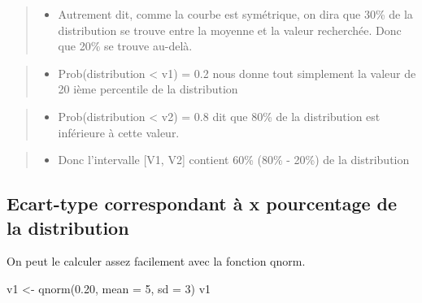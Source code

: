 \documentclass[
]{article}
\newenvironment{Shaded}{\begin{snugshade}}{\end{snugshade}}
\newcommand{\AttributeTok}[1]{\textcolor[rgb]{0.77,0.63,0.00}{#1}}
\newcommand{\DecValTok}[1]{\textcolor[rgb]{0.00,0.00,0.81}{#1}}
\newcommand{\FloatTok}[1]{\textcolor[rgb]{0.00,0.00,0.81}{#1}}
\newcommand{\FunctionTok}[1]{\textcolor[rgb]{0.00,0.00,0.00}{#1}}
\newcommand{\NormalTok}[1]{#1}
\newcommand{\OtherTok}[1]{\textcolor[rgb]{0.56,0.35,0.01}{#1}}
\providecommand{\tightlist}{%
  \setlength{\itemsep}{0pt}\setlength{\parskip}{0pt}}
\begin{document}
\begin{quote}
\begin{itemize}
\tightlist
\item
  Autrement dit, comme la courbe est symétrique, on dira que 30\% de la
  distribution se trouve entre la moyenne et la valeur recherchée. Donc
  que 20\% se trouve au-delà.
\end{itemize}
\end{quote}

\begin{quote}
\begin{itemize}
\tightlist
\item
  Prob(distribution \textless{} v1) = 0.2 nous donne tout simplement la
  valeur de 20 ième percentile de la distribution
\end{itemize}
\end{quote}

\begin{quote}
\begin{itemize}
\tightlist
\item
  Prob(distribution \textless{} v2) = 0.8 dit que 80\% de la
  distribution est inférieure à cette valeur.
\end{itemize}
\end{quote}

\begin{quote}
\begin{itemize}
\tightlist
\item
  Donc l'intervalle {[}V1, V2{]} contient 60\% (80\% - 20\%) de la
  distribution
\end{itemize}
\end{quote}

\hypertarget{ecart-type-correspondant-uxe0-x-pourcentage-de-la-distribution-1}{%
\subsection{Ecart-type correspondant à x pourcentage de la
distribution}\label{ecart-type-correspondant-uxe0-x-pourcentage-de-la-distribution-1}}

On peut le calculer assez facilement avec la fonction qnorm.

\begin{Shaded}
\begin{Highlighting}[]
\NormalTok{v1 }\OtherTok{\textless{}{-}} \FunctionTok{qnorm}\NormalTok{(}\FloatTok{0.20}\NormalTok{, }\AttributeTok{mean =} \DecValTok{5}\NormalTok{, }\AttributeTok{sd =} \DecValTok{3}\NormalTok{)}
\NormalTok{v1}
\end{Highlighting}
\end{Shaded}
\end{document}
